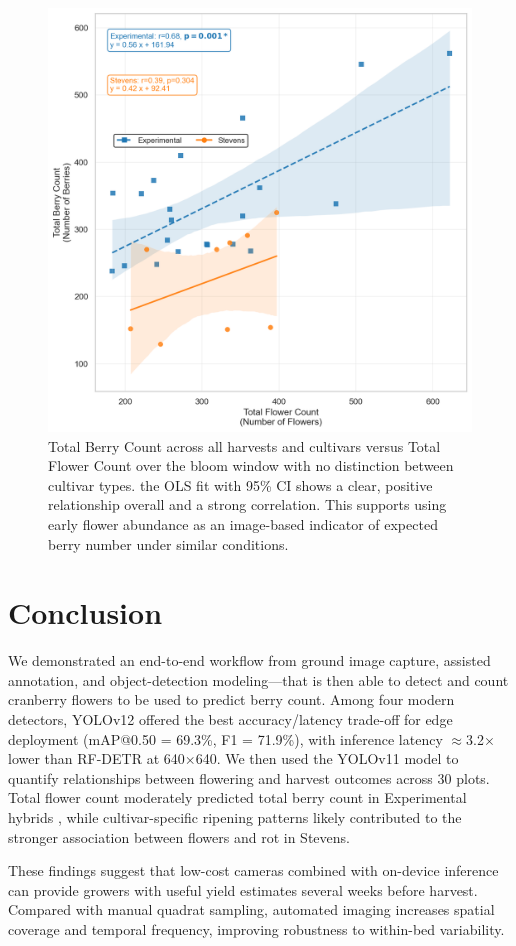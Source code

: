 \begin{figure}[H]
    \centering
    \includegraphics[width=0.75\linewidth]{images/TBC vs TFC.png}
    \caption{Total Berry Count across all harvests and cultivars versus Total Flower Count over the bloom window with no distinction between cultivar types. the OLS fit with 95\% CI shows a clear, positive relationship overall and a strong correlation. This supports using early flower abundance as an image-based indicator of expected berry number under similar conditions.}
    \label{fig:TBC vs TFC}
\end{figure}


\section{Conclusion}
We demonstrated an end-to-end workflow from ground image capture, assisted annotation, and object-detection modeling—that is then able to detect and count cranberry flowers to be used to predict berry count. Among four modern detectors, YOLOv12 offered the best accuracy/latency trade-off for edge deployment (mAP@0.50 = 69.3\%, F1 = 71.9\%), with inference latency $\approx$3.2$\times$ lower than RF-DETR at 640$\times$640. We then used the YOLOv11 model to quantify relationships between flowering and harvest outcomes across 30 plots. Total flower count moderately predicted total berry count in Experimental hybrids , while cultivar-specific ripening patterns likely contributed to the stronger association between flowers and rot in Stevens. 

These findings suggest that low-cost cameras combined with on-device inference can provide growers with useful yield estimates several weeks before harvest. Compared with manual quadrat sampling, automated imaging increases spatial coverage and temporal frequency, improving robustness to within-bed variability. 

